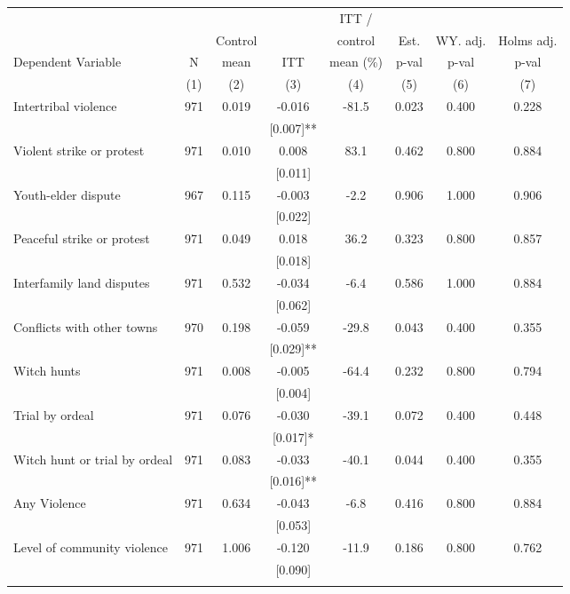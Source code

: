\begin{tabular}{lccccccc}
\hline \noalign{\smallskip} &  &  &  & ITT / &  &  & \\
 &  & Control &  & control & Est. & WY. adj. & Holms adj.\\
Dependent Variable & N & mean & ITT & mean (\%) & p-val & p-val & p-val\\
 & (1) & (2) & (3) & (4) & (5) & (6) & (7)\\
\noalign{\smallskip}\hline \noalign{\smallskip}\quad Intertribal violence & 971 & 0.019 & -0.016 & -81.5 & 0.023 & 0.400 & 0.228\\
 &  &  & [0.007]** &  &  &  & \\
\quad Violent strike or protest & 971 & 0.010 & 0.008 & 83.1 & 0.462 & 0.800 & 0.884\\
 &  &  & [0.011] &  &  &  & \\
\quad Youth-elder dispute & 967 & 0.115 & -0.003 & -2.2 & 0.906 & 1.000 & 0.906\\
 &  &  & [0.022] &  &  &  & \\
\quad Peaceful strike or protest & 971 & 0.049 & 0.018 & 36.2 & 0.323 & 0.800 & 0.857\\
 &  &  & [0.018] &  &  &  & \\
\quad Interfamily land disputes & 971 & 0.532 & -0.034 & -6.4 & 0.586 & 1.000 & 0.884\\
 &  &  & [0.062] &  &  &  & \\
\quad Conflicts with other towns & 970 & 0.198 & -0.059 & -29.8 & 0.043 & 0.400 & 0.355\\
 &  &  & [0.029]** &  &  &  & \\
\quad Witch hunts & 971 & 0.008 & -0.005 & -64.4 & 0.232 & 0.800 & 0.794\\
 &  &  & [0.004] &  &  &  & \\
\quad Trial by ordeal & 971 & 0.076 & -0.030 & -39.1 & 0.072 & 0.400 & 0.448\\
 &  &  & [0.017]* &  &  &  & \\
\quad Witch hunt or trial by ordeal & 971 & 0.083 & -0.033 & -40.1 & 0.044 & 0.400 & 0.355\\
 &  &  & [0.016]** &  &  &  & \\
Any Violence & 971 & 0.634 & -0.043 & -6.8 & 0.416 & 0.800 & 0.884\\
 &  &  & [0.053] &  &  &  & \\
Level of community violence & 971 & 1.006 & -0.120 & -11.9 & 0.186 & 0.800 & 0.762\\
 &  &  & [0.090] &  &  &  & \\
\noalign{\smallskip}\hline\end{tabular}
